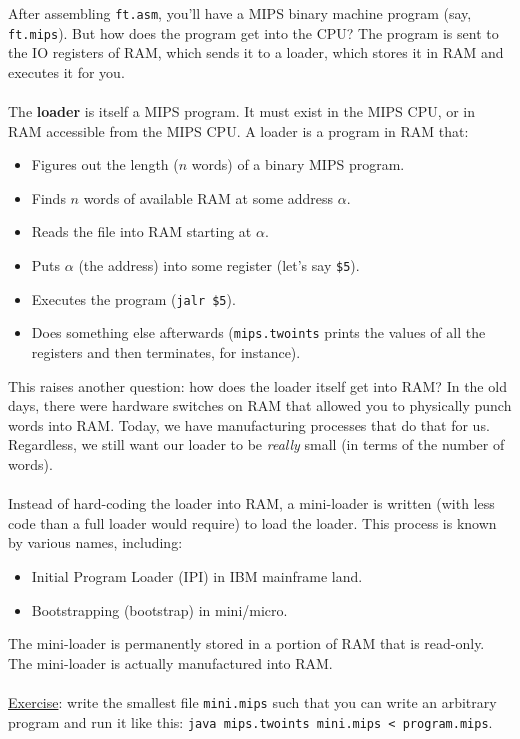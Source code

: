 \documentclass[]{article}
\theoremstyle{definition}
\begin{document}
			After assembling \verb+ft.asm+, you'll have a MIPS binary machine program (say, \verb+ft.mips+). But how does the program get into the CPU? The program is sent to the IO registers of RAM, which sends it to a loader, which stores it in RAM and executes it for you.
			\\ \\
			The \textbf{loader} is itself a MIPS program. It must exist in the MIPS CPU, or in RAM accessible from the MIPS CPU. A loader is a program in RAM that:
			\begin{itemize}
				\item Figures out the length ($n$ words) of a binary MIPS program.
				\item Finds $n$ words of available RAM at some address $\alpha$.
				\item Reads the file into RAM starting at $\alpha$.
				\item Puts $\alpha$ (the address) into some register (let's say \verb+$5+).
				\item Executes the program (\verb+jalr $5+).
				\item Does something else afterwards (\verb+mips.twoints+ prints the values of all the registers and then terminates, for instance).
			\end{itemize}
			This raises another question: how does the loader itself get into RAM? In the old days, there were hardware switches on RAM that allowed you to physically punch words into RAM. Today, we have manufacturing processes that do that for us. Regardless, we still want our loader to be \emph{really} small (in terms of the number of words).
			\\ \\
			Instead of hard-coding the loader into RAM, a mini-loader is written (with less code than a full loader would require) to load the loader. This process is known by various names, including:
			\begin{itemize}
				\item Initial Program Loader (IPI) in IBM mainframe land.
				\item Bootstrapping (bootstrap) in mini/micro.
			\end{itemize}

			The mini-loader is permanently stored in a portion of RAM that is read-only. The mini-loader is actually manufactured into RAM.
			\\ \\
			\underline{Exercise}: write the smallest file \verb+mini.mips+ such that you can write an arbitrary program and run it like this: \verb+java mips.twoints mini.mips < program.mips+.
\end{document}
